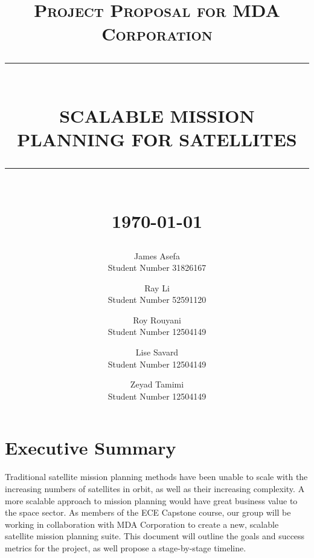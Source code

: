 \documentclass[12pt]{article}
\newcommand{\HRule}[1]{\rule{\linewidth}{#1}}
\begin{document}
\title{
    \normalsize \textsc{Project Proposal for MDA Corporation}
    \\ [2.0cm]
    \HRule{0.5pt} \\
    \LARGE \textbf{\uppercase{Scalable Mission Planning for Satellites}}
	\HRule{2pt} \\ [0.5cm]
	\normalsize \today \vspace*{5\baselineskip}
}

\date{}

\author{
    James Asefa \\ Student Number 31826167
    \and
    Ray Li \\ Student Number 52591120
    \and
    Roy Rouyani \\ Student Number 12504149
    \and 
    Lise Savard \\ Student Number 12504149
    \and
    Zeyad Tamimi \\ Student Number 12504149
}

\maketitle
\newpage
\tableofcontents
\newpage

\sectionfont{\scshape}


\section*{Executive Summary}
Traditional satellite mission planning methods have been unable to scale with the increasing numbers of satellites in orbit, as well as their increasing complexity. A more scalable approach to mission planning would have great business value to the space sector.
As members of the ECE Capstone course, our group will be working in collaboration with MDA Corporation to create a new, scalable satellite mission planning suite. This document will outline the goals and success metrics for the project, as well propose a stage-by-stage timeline.


\newpage
\end{document}
